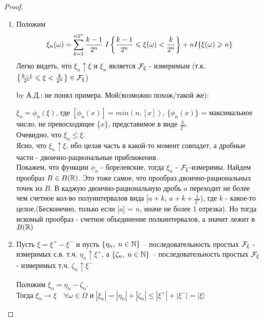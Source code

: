 \begin{proof}~
  \begin{enumerate}
    \item 
      Положим
      \begin{align*}
        \xi_n(\omega) = \sum_{k = 1}^{n 2^n} \frac{k - 1}{2^n} \;
        I \left\{  \frac{k - 1}{2^n} \leqslant \xi(\omega) < \frac{k}{2^n}  \right\} + n I\{\xi(\omega) \geqslant n\}
      \end{align*}
      Легко видеть, что $\xi_n \uparrow \xi$ и $\xi_n$ является $\mathcal{F}_\xi$ - измеримым
      (т.к. $\left\{ \frac{k - 1}{2^n} \leqslant \xi < \frac{k}{2^n} \right\} \in \mathcal{F}_\xi$)

	by А.Д.: не понял примера. Мой(возможно похож/такой же): 
	
	$\xi_n = \phi_{n}(\xi)$, где $[\phi_{n}(x)] = min(n,[x])$, \{$\phi_{n}(x)$\} = максимальное число, не превосходящее \{$x$\}, представимое в виде $\frac{k}{2^n}$. \\
	Очевидно, что $\xi_n \leq \xi$. \\
	Ясно, что $\xi_n \uparrow \xi$, ибо целая часть в какой-то момент совпадет, а дробные части - двоично-рациональные приближения. \\
	Покажем, что функции $\phi_n$ - борелевские, тогда $\xi_n$ - $\mathcal{F}_\xi$-измеримы.
	Найдем прообраз $B \in B(\mathbb{R})$. Это тоже самое, что прообраз двоично-рациональных точек из $B$. В каджую двоично-рациональную дробь $a$ переходит не более чем счетное кол-во полуинтервалов вида [$a + k$, $a + k + \frac{1}{2^n}$), где $k$ - какое-то целое.(Бесконечно, только если [$a$] = $n$, иначе не более 1 отрезка). Но тогда искомый прообраз - счетное объединение полкинтервалов, а значит лежит в $B(\mathbb{R})$

    \item 
      Пусть $\xi = \xi^+ - \xi^-$ и пусть $\{\eta_n,\; n \in \mathbb{N} \}$ -- последовательность
      простых $\mathcal{F}_\xi$ - измеримых с.в. т.ч. $\eta_n \uparrow \xi^+$, а
      $\{ \zeta_n,\; n \in \mathbb{N} \}$ -- последовательность простых $\mathcal{F}_\xi$ - измеримых
      т.ч. $\zeta_n \uparrow \xi^{-}$

      Положим $\xi_n = \eta_n - \zeta_n$.\\
      Тогда $\xi_n \to \xi \quad \forall \omega \in \Omega$ и 
      $|\xi_n| = |\eta_n| + |\zeta_n| \leq |\xi^+| + |\xi^-| = |\xi|$
   \end{enumerate}
\end{proof}


